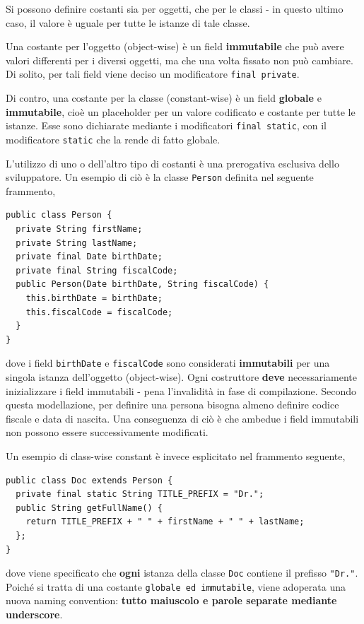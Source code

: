 \documentclass[\fontsizeclass,twocolumn]{\classname}
\theoremstyle{definition}
\theoremstyle{definition}
\begin{document}
Si possono definire costanti sia per oggetti, che per le classi \-- in questo
ultimo caso, il valore è uguale per tutte le istanze di tale classe.

Una costante per l'oggetto (object-wise) è un field \textbf{immutabile} che può avere valori
differenti per i diversi oggetti, ma che una volta fissato non può cambiare. Di
solito, per tali field viene deciso un modificatore \texttt{final private}.

Di contro, una costante per la classe (constant-wise) è un field
\textbf{globale} e \textbf{immutabile}, cioè un placeholder per un valore
codificato e costante per tutte le istanze. Esse sono dichiarate mediante i
modificatori \texttt{final static}, con il modificatore \texttt{static} che la
rende di fatto globale.

L'utilizzo di uno o dell'altro tipo di costanti è una prerogativa esclusiva
dello sviluppatore. Un esempio di ciò è la classe \texttt{Person} definita nel
seguente frammento,

\begin{lstlisting}
public class Person {
  private String firstName;
  private String lastName;
  private final Date birthDate;
  private final String fiscalCode;
  public Person(Date birthDate, String fiscalCode) {
    this.birthDate = birthDate;
    this.fiscalCode = fiscalCode;
  }
}
\end{lstlisting}

dove i field \texttt{birthDate} e \texttt{fiscalCode} sono considerati
\textbf{immutabili} per una singola istanza dell'oggetto (object-wise). Ogni
costruttore \textbf{deve} necessariamente inizializzare i field immutabili \--
pena l'invalidità in fase di compilazione. Secondo questa modellazione, per
definire una persona bisogna almeno definire codice fiscale e data di nascita.
Una conseguenza di ciò è che ambedue i field immutabili non possono essere
successivamente modificati.

Un esempio di class-wise constant è invece esplicitato nel frammento seguente,

\begin{lstlisting}
public class Doc extends Person {
  private final static String TITLE_PREFIX = "Dr.";
  public String getFullName() {
    return TITLE_PREFIX + " " + firstName + " " + lastName;
  };
}
\end{lstlisting}

dove viene specificato che \textbf{ogni} istanza della classe \texttt{Doc}
contiene il prefisso \texttt{"Dr."}. Poiché si tratta di una costante
\texttt{globale ed immutabile}, viene adoperata una nuova naming convention:
\textbf{tutto maiuscolo e parole separate mediante underscore}.
\end{document}
